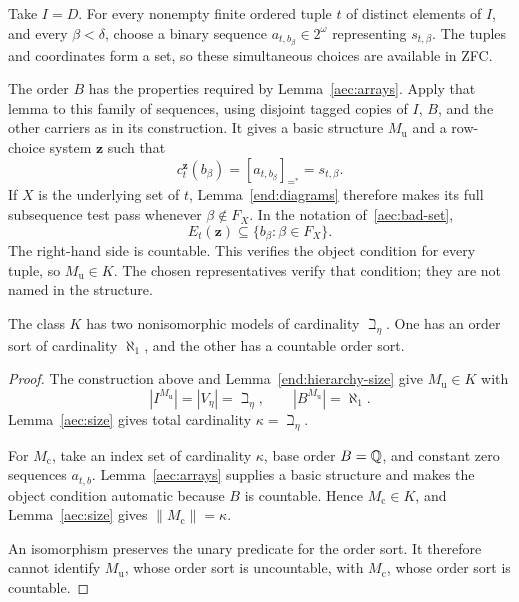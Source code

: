 Take \(I=D\). For every nonempty finite ordered tuple \(t\) of
distinct elements of \(I\), and every \(\beta<\delta\), choose a binary
sequence \(a_{t,b_\beta}\in2^\omega\) representing \(s_{t,\beta}\).
The tuples and coordinates form a set, so these simultaneous choices
are available in ZFC.

The order \(B\) has the properties required by Lemma~\ref{aec:arrays}.
Apply that lemma to this family of sequences, using disjoint tagged
copies of \(I\), \(B\), and the other carriers as in its construction.
It gives a basic structure \(M_{\mathrm u}\) and a row-choice system
\(\mathbf z\) such that
\[
 c_t^{\mathbf z}(b_\beta)
   =[a_{t,b_\beta}]_{=^*}
   =s_{t,\beta}.
\]
If \(X\) is the underlying set of \(t\), Lemma~\ref{end:diagrams}
therefore makes its full subsequence test pass whenever
\(\beta\notin F_X\). In the notation of~\eqref{aec:bad-set},
\[
 E_t(\mathbf z)\subseteq\{b_\beta:\beta\in F_X\}.
\]
The right-hand side is countable. This verifies the object condition
for every tuple, so \(M_{\mathrm u}\in K\). The chosen representatives
verify that condition; they are not named in the structure.

\begin{theorem}\label{end:two-models}
The class \(K\) has two nonisomorphic models of
cardinality \(\beth_\eta\).  One has an order sort
of cardinality \(\aleph_1\), and the other has a
countable order sort.
\end{theorem}

\begin{proof}
The construction above and Lemma~\ref{end:hierarchy-size} give
\(M_{\mathrm u}\in K\) with
\[
  |I^{M_{\mathrm u}}|=|V_\eta|=\beth_\eta,
  \qquad
  |B^{M_{\mathrm u}}|=\aleph_1.
\]
Lemma~\ref{aec:size} gives total cardinality
\(\kappa=\beth_\eta\).

For \(M_{\mathrm c}\), take an index set of cardinality \(\kappa\),
base order \(B=\mathbb Q\), and constant zero sequences \(a_{t,b}\).
Lemma~\ref{aec:arrays} supplies a basic structure and makes the object
condition automatic because \(B\) is countable. Hence
\(M_{\mathrm c}\in K\), and Lemma~\ref{aec:size} gives
\(\|M_{\mathrm c}\|=\kappa\).

An isomorphism preserves the unary predicate
for the order sort.  It therefore cannot identify
\(M_{\mathrm u}\), whose order sort is uncountable,
with \(M_{\mathrm c}\), whose order sort is
countable.
\end{proof}
